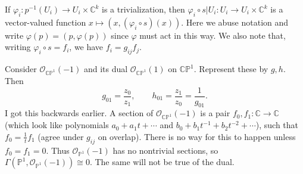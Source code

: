 If $\varphi _i : p ^{-1} (U_i) \to U_i\times \mathbb{C} ^k$ is a trivialization, then $\varphi _i \circ s|U_i : U_i \to U_i\times \mathbb{C} ^k$ is a vector-valued function $x\mapsto (x,(\varphi_i \circ s)(x))$. Here we abuse notation and write $\varphi (p) = (p,\varphi (p))$ since $\varphi $ must act in this way. We also note that, writing $\varphi _i \circ s = f_i$, we have $f_i = g_{ij} f_j$.

Consider $\mathcal{O} _{\mathbb{C} \mathbb{P} ^1} (-1)$ and its dual $\mathcal{O} _{\mathbb{C} \mathbb{P}^1 } (1)$ on $\mathbb{C} \mathbb{P} ^1$. Represent these by $g,h$. Then
\[
	g_{01} =\frac{z_0}{z_1} ,\qquad h_{01} =\frac{z_1}{z_0} =\frac{1}{g_{01} } 
.\]
I got this backwards earlier. A section of $\mathcal{O} _{\mathbb{C} \mathbb{P} ^1} (-1)$ is a pair $f_0,f_1 :  \mathbb{C} \to \mathbb{C} $ (which look like polynomials $a_0+a_1t+ \cdots $ and $b_0+b_1t^{-1}+b_2t ^{-2}+ \cdots $), such that $f_0 = \frac{1}{t} f_1$ (agree under $g_{ij} $ on overlap). There is no way for this to happen unless $f_0=f_1=0$. Thus $\mathcal{O} _{\mathbb{P} ^1} (-1)$ has no nontrivial sections, so $\Gamma (\mathbb{P} ^1,\mathcal{O} _{\mathbb{P} ^1} (-1))\cong 0$. The same will not be true of the dual.

